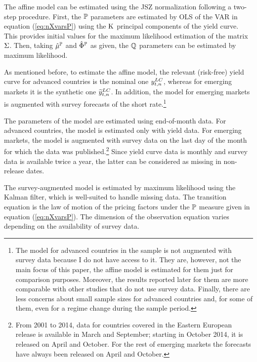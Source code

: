 {The affine model can be estimated using the JSZ normalization following a two-step procedure. 
First, the \(\mathbb{P}\) parameters are estimated by OLS of the VAR in equation (\ref{eq:nXvarsP}) using the \(\mathrm{K}\) principal components of the yield curve. This provides initial values for the maximum likelihood estimation of the matrix \(\Sigma\). Then, taking \(\hat{\mu}^{\mathbb{P}}\) and \(\hat{\Phi}^{\mathbb{P}}\) as given, the \(\mathbb{Q}\) parameters can be estimated by maximum likelihood. 

As mentioned before, to estimate the affine model, the relevant (risk-free) yield curve for advanced countries is the nominal one \(y_{t,n} ^{LC}\), whereas for emerging markets it is the synthetic one \(\widetilde{y}_{t,n} ^{LC}\).
In addition, the model for emerging markets is augmented with survey forecasts of the short rate.\footnote{ The model for advanced countries in the sample is not augmented with survey data because I do not have access to it. They are, however, not the main focus of this paper, the affine model is estimated for them just for comparison purposes. Moreover, the results reported later for them are more comparable with other studies that do not use survey data. Finally, there are less concerns about small sample sizes for advanced countries and, for some of them, even for a regime change during the sample period.} 

The parameters of the model are estimated using end-of-month data.
For advanced countries, the model is estimated only with yield data.
For emerging markets, the model is augmented with survey data on the last day of the month for which the data was published.\footnote{ From 2001 to 2014, data for countries covered in the Eastern European release is available in March and September; starting in October 2014, it is released on April and October. For the rest of emerging markets the forecasts have always been released on April and October.}
Since yield curve data is monthly and survey data is available twice a year, the latter can be considered as missing in non-release dates.

The survey-augmented model is estimated by maximum likelihood using the Kalman filter, which is well-suited to handle missing data. 
The transition equation is the law of motion of the pricing factors under the \(\mathbb{P}\) measure given in equation (\ref{eq:nXvarsP}).
The dimension of the observation equation varies depending on the availability of survey data. 

}
